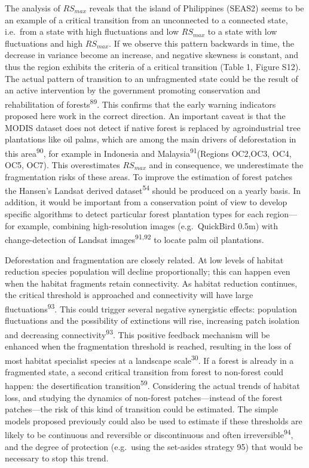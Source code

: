 \documentclass[]{article}
\begin{document}
The analysis of \(RS_{max}\) reveals that the island of Philippines
(SEAS2) seems to be an example of a critical transition from an
unconnected to a connected state, i.e.~from a state with high
fluctuations and low \(RS_{max}\) to a state with low fluctuations and
high \(RS_{max}\). If we observe this pattern backwards in time, the
decrease in variance become an increase, and negative skewness is
constant, and thus the region exhibits the criteria of a critical
transition (Table 1, Figure S12). The actual pattern of transition to an
unfragmented state could be the result of an active intervention by the
government promoting conservation and rehabilitation of
forests\textsuperscript{89}. This confirms that the early warning
indicators proposed here work in the correct direction. An important
caveat is that the MODIS dataset does not detect if native forest is
replaced by agroindustrial tree plantations like oil palms, which are
among the main drivers of deforestation in this
area\textsuperscript{90}, for example in Indonesia and
Malaysia\textsuperscript{91}(Regions OC2,OC3, OC4, OC5, OC7). This
overestimates \(RS_{max}\) and in consequence, we underestimate the
fragmentation risks of these areas. To improve the estimation of forest
patches the Hansen's Landsat derived dataset\textsuperscript{54} should
be produced on a yearly basis. In addition, it would be important from a
conservation point of view to develop specific algorithms to detect
particular forest plantation types for each region---for example,
combining high-resolution images (e.g.~QuickBird 0.5m) with
change-detection of Landsat images\textsuperscript{91,92} to locate palm
oil plantations.

Deforestation and fragmentation are closely related. At low levels of
habitat reduction species population will decline proportionally; this
can happen even when the habitat fragments retain connectivity. As
habitat reduction continues, the critical threshold is approached and
connectivity will have large fluctuations\textsuperscript{93}. This
could trigger several negative synergistic effects: population
fluctuations and the possibility of extinctions will rise, increasing
patch isolation and decreasing connectivity\textsuperscript{93}. This
positive feedback mechanism will be enhanced when the fragmentation
threshold is reached, resulting in the loss of most habitat specialist
species at a landscape scale\textsuperscript{30}. If a forest is already
in a fragmented state, a second critical transition from forest to
non-forest could happen: the desertification
transition\textsuperscript{59}. Considering the actual trends of habitat
loss, and studying the dynamics of non-forest patches---instead of the
forest patches---the risk of this kind of transition could be estimated.
The simple models proposed previously could also be used to estimate if
these thresholds are likely to be continuous and reversible or
discontinuous and often irreversible\textsuperscript{94}, and the degree
of protection (e.g.~using the set-asides strategy 95) that would be
necessary to stop this trend.
\end{document}

